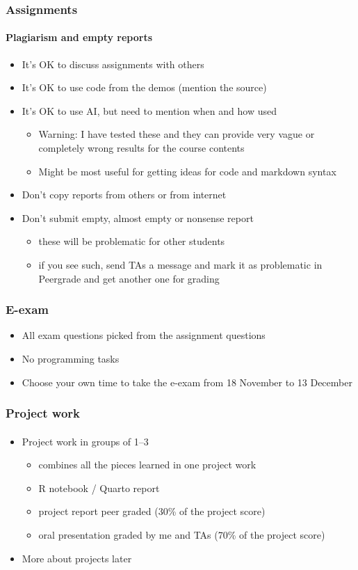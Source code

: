 \documentclass[english,t]{beamer}
\begin{document}
\begin{frame}
  \frametitle{Assignments}  %
  \framesubtitle{Plagiarism and empty reports}
  \begin{itemize}
  \item It's OK to discuss assignments with others
  \item It's OK to use code from the demos (mention the source)
  \item It's OK to use AI, but need to mention when and how used
    \begin{itemize}
    \item Warning: I have tested these and they can provide very vague
      or completely wrong results for the course contents
    \item Might be most useful for getting ideas for code and markdown syntax
    \end{itemize}
  \item Don't copy reports from others or from internet
  \item Don't submit empty, almost empty or nonsense report
    \begin{itemize}
    \item these will be problematic for other students
    \item if you see such, send TAs a message and mark it as
      problematic in Peergrade and get another one for grading
    \end{itemize}
  \end{itemize}
  
\end{frame}

\begin{frame}
  \frametitle{E-exam}  %
  \begin{itemize}
  \item All exam questions picked from the assignment questions
  \item No programming tasks
  \item Choose your own time to take the e-exam from 18 November to 13
    December
  \end{itemize}
  
\end{frame}


\begin{frame}
  \frametitle{Project work}  %
  \framesubtitle{}
  \begin{itemize}
  \item Project work in groups of 1--3
    \begin{itemize}
    \item combines all the pieces learned in one project work
    \item R notebook / Quarto report
    \item project report peer graded (30\% of the project score)
    \item oral presentation graded by me and TAs (70\% of the project score)
    \end{itemize}
  \item More about projects later
  \end{itemize}
  
\end{frame}
\end{document}
